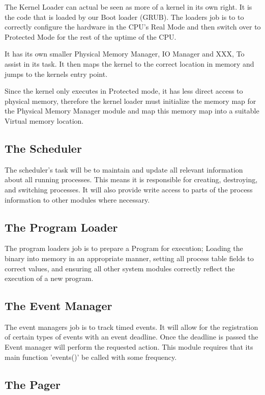 \documentclass[a4paper]{report}
\begin{document}
The Kernel Loader can actual be seen as more of a kernel in its own right. It is the code that is loaded by our Boot loader (GRUB). The loaders job is to to correctly configure the hardware in the CPU's Real Mode and then switch over to Protected Mode for the rest of the uptime of the CPU.

It has its own smaller Physical Memory Manager, IO Manager and XXX, To assist in its task. It then maps the kernel to the correct location in memory and jumps to the kernels entry point.

Since the kernel only executes in Protected mode, it has less direct access to physical memory, therefore the kernel loader must initialize the memory map for the Physical Memory Manager module and map this memory map into a suitable Virtual memory location.

\subsection{The Scheduler}

The scheduler's task will be to maintain and update all relevant information about all running processes. This means it is responsible for creating, destroying, and switching processes. It will also provide write access to parts of the process information to other modules where necessary.

\subsection{The Program Loader}

The program loaders job is to prepare a Program for execution; Loading the binary into memory in an appropriate manner, setting all process table fields to correct values, and ensuring all other system modules correctly reflect the execution of a new program.

\subsection{The Event Manager}

The event managers job is to track timed events. It will allow for the registration of certain types of events with an event deadline. Once the deadline is passed the Event manager will perform the requested action. This module requires that its main function 'events()' be called with some frequency.

\subsection{The Pager}
\end{document}
